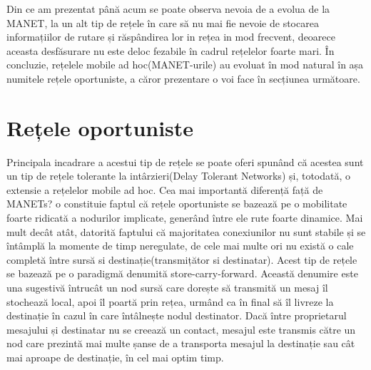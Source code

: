 \documentclass[12pt,a4paper]{report}
\begin{document}
Din ce am prezentat până acum se poate observa nevoia de a evolua de la MANET, la un alt tip de rețele în care să 
nu mai fie nevoie de stocarea informațiilor de rutare și răspândirea lor in rețea in mod frecvent, deoarece aceasta desfăsurare nu este deloc fezabile în cadrul rețelelor foarte mari. În concluzie, rețelele mobile ad hoc(MANET-urile) au evoluat în mod natural în așa numitele rețele oportuniste, a căror prezentare o voi face în secțiunea următoare.

\section{Rețele oportuniste}
Principala incadrare a acestui tip de rețele se poate oferi spunând că acestea sunt un tip de rețele tolerante la intârzieri(Delay Tolerant Networks) și, totodată, o extensie a rețelelor mobile ad hoc. Cea mai importantă diferență față de MANETs? o constituie faptul că rețele oportuniste se bazează pe o mobilitate foarte ridicată a nodurilor implicate, generând între ele rute foarte dinamice. Mai mult decât atât, datorită faptului că majoritatea conexiunilor nu sunt stabile și se întâmplă la momente de timp neregulate, de cele mai multe ori nu există o cale completă între sursă si destinație(transmițător si destinatar). Acest tip de rețele se bazează pe o paradigmă denumită store-carry-forward. Această denumire este una sugestivă întrucât un nod sursă care dorește să transmită un mesaj îl stochează local, apoi îl poartă prin rețea, urmând ca în final să îl livreze la destinație în cazul în care întâlnește nodul destinator. Dacă între proprietarul mesajului și destinatar nu se creează un contact, mesajul este transmis către un nod care prezintă mai multe șanse de a transporta mesajul la destinație sau cât mai aproape de destinație, în cel mai optim timp.
\end{document}
